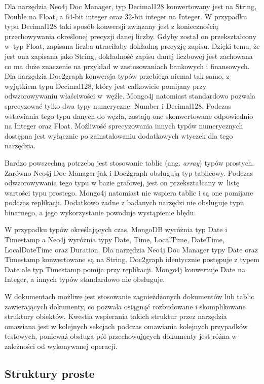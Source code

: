 \documentclass[a4paper,twoside,12pt]{book}
\newcommand{\obcy}[1]{\emph{#1}}
\newcommand{\ang}[1]{{\selectlanguage{british}\obcy{#1}}}
\begin{document}
Dla narzędzia Neo4j Doc Manager, typ Decimal128 konwertowany jest na String, Double na Float, a 64-bit integer oraz 32-bit integer na Integer. W przypadku typu Decimal128 taki sposób konwersji związany jest z koniecznością przechowywania określonej precyzji danej liczby. Gdyby został on przekształcony w~typ Float, zapisana liczba utraciłaby dokładną precyzję zapisu. Dzięki temu, że jest ona zapisana jako String, dokładność zapisu danej liczbowej jest zachowana co ma duże znaczenie na przykład w zastosowaniach bankowych i finansowych. Dla narzędzia Doc2graph konwersja typów przebiega niemal tak samo, z wyjątkiem typu Decimal128, który jest całkowicie pomijany przy odwzorowywaniu właściwości w~węźle. Mongo4j natomiast standardowo pozwala sprecyzować tylko dwa typy numeryczne: Number i Decimal128. Podczas wstawiania tego typu danych do węzła, zostają one skonwertowane odpowiednio na Integer oraz Float. Możliwość sprecyzowania innych typów numerycznych dostępna jest wyłącznie po zainstalowaniu dodatkowych wtyczek dla tego narzędzia.

Bardzo powszechną potrzebą jest stosowanie tablic (ang. \ang{array}) typów prostych. Zarówno Neo4j Doc Manager jak i Doc2graph obsługują typ tablicowy. Podczas odwzorowywania tego typu w bazie grafowej, jest on przekształcany w~listę wartości typu prostego. Mongo4j natomiast nie wspiera tablic i są one pomijane podczas replikacji. Dodatkowo żadne z badanych narzędzi nie obsługuje typu binarnego, a jego wykorzystanie powoduje wystąpienie błędu.

W przypadku typów określających czas, MongoDB wyróżnia typ Date i Timestamp a Neo4j wyróżnia typy Date, Time, LocalTime, DateTime, LocalDateTime oraz Duration. Dla narzędzia Neo4j Doc Manager typy Date oraz Timestamp konwertowane są na String. Doc2graph identycznie postępuje z typem Date ale typ Timestamp pomija przy replikacji. Mongo4j konwertuje Date na Integer, a innych typów standardowo nie obsługuje.   

W dokumentach możliwe jest stosowanie zagnieżdżonych dokumentów lub tablic zawierających dokumenty, co pozwala osiągnąć rozbudowane i skomplikowane struktury obiektów. Kwestia wspierania takich struktur przez narzędzia omawiana jest w kolejnych sekcjach podczas omawiania kolejnych przypadków testowych, ponieważ obsługa pól przechowujących dokumenty jest różna w zależności od wykonywanej operacji.

\subsection{Struktury proste}
\label{section:struktury-proste}
\end{document}
